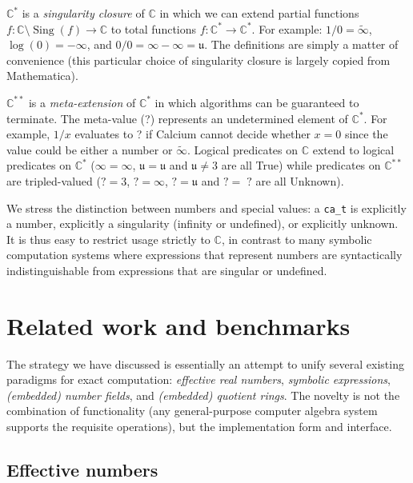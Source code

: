 \documentclass[11pt,a4paper]{article}
\begin{document}
$\mathbb{C}^{*}$ is a \emph{singularity closure} of $\mathbb{C}$ in which
we can extend partial functions $f : \mathbb{C} \setminus \operatorname{Sing}(f) \rightarrow \mathbb{C}$ to
total functions $f : \mathbb{C}^{*} \rightarrow \mathbb{C}^{*}$.
For example: $1 / 0 = \tilde \infty$, $\log(0) = -\infty$, and $0 / 0 = \infty - \infty = \mathfrak{u}$.
The definitions are simply a matter of convenience
(this particular choice of singularity closure is largely copied from Mathematica).

$\mathbb{C}^{**}$ is a \emph{meta-extension} of $\mathbb{C}^{*}$
in which algorithms can be guaranteed to terminate.
The meta-value (?) represents an undetermined element of $\mathbb{C}^{*}$.
For example, $1 / x$ evaluates to ? if Calcium cannot decide whether $x = 0$
since the value could be either a number or $\tilde \infty$.
Logical predicates on $\mathbb{C}$ extend to logical predicates on $\mathbb{C}^{*}$
($\infty = \infty$, $\mathfrak{u} = \mathfrak{u}$ and $\mathfrak{u} \ne 3$ are all True)
while predicates on $\mathbb{C}^{**}$ are tripled-valued
($? = 3$, $? = \infty$, $? = \mathfrak{u}$ and $? =\;?$ are all Unknown).

We stress the distinction between numbers and special values:
a \texttt{ca\_t} is explicitly
a number, explicitly a singularity (infinity or undefined),
or explicitly unknown.
It is thus easy to restrict usage strictly to $\mathbb{C}$,
in contrast to many symbolic
computation systems where expressions that represent numbers
are syntactically indistinguishable from expressions that are
singular or undefined.

\section{Related work and benchmarks}

\label{sect:related}

The strategy we have discussed
is essentially an attempt to unify several existing
paradigms for exact computation: \emph{effective real numbers},
\emph{symbolic expressions}, \emph{(embedded) number fields},
and \emph{(embedded) quotient rings}. The novelty is not the combination
of functionality (any general-purpose
computer algebra system supports the requisite operations), but the implementation form and interface.

\subsection{Effective numbers}
\end{document}
